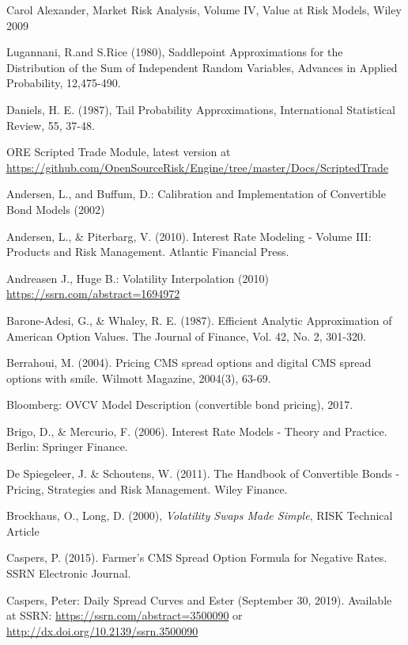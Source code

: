\begin{thebibliography}{*}
 Carol Alexander, Market Risk Analysis, Volume IV, Value at Risk Models, Wiley 2009

 Lugannani, R.and S.Rice (1980), Saddlepoint Approximations for the Distribution of the Sum of
  Independent Random Variables, Advances in Applied Probability, 12,475-490.

 Daniels, H. E. (1987), Tail Probability Approximations, International Statistical Review, 55, 37-48.

 ORE Scripted Trade Module, latest version at \url{https://github.com/OpenSourceRisk/Engine/tree/master/Docs/ScriptedTrade}

   Andersen, L., and Buffum, D.: Calibration and Implementation of Convertible Bond Models (2002)

 Andersen, L., \& Piterbarg, V. (2010). Interest Rate Modeling - Volume III: Products and Risk Management. Atlantic Financial Press.

 Andreasen J., Huge B.: Volatility Interpolation (2010) \url{https://ssrn.com/abstract=1694972}

 Barone-Adesi, G., \& Whaley, R. E. (1987). Efficient Analytic Approximation of American Option Values. The Journal of Finance, Vol. 42, No. 2, 301-320.

 Berrahoui, M. (2004). Pricing CMS spread options and digital CMS spread options with smile. Wilmott Magazine, 2004(3), 63-69.

 Bloomberg: OVCV Model Description (convertible bond pricing), 2017.

 Brigo, D., \& Mercurio, F. (2006). Interest Rate Models - Theory and Practice. Berlin: Springer Finance.

 De Spiegeleer, J. \& Schoutens, W. (2011). The Handbook of Convertible Bonds - Pricing, Strategies and Risk Management. Wiley Finance.

 Brockhaus, O., Long, D. (2000), {\em Volatility Swaps Made Simple}, RISK Technical Article

 Caspers, P. (2015). Farmer's CMS Spread Option Formula for Negative Rates. SSRN Electronic Journal.

 Caspers, Peter: Daily Spread Curves and Ester (September 30, 2019). Available at SSRN:
  \url{https://ssrn.com/abstract=3500090} or \url{http://dx.doi.org/10.2139/ssrn.3500090}


\end{thebibliography}
